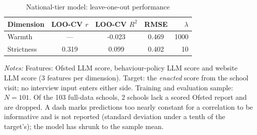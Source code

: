 \begin{table}[htbp]
\centering\caption{National-tier model: leave-one-out performance}
\label{tab:national_model_loo}

\small
\begin{tabular}{lcccr}
\toprule
Dimension & LOO-CV $r$ & LOO-CV $R^2$ & RMSE & $\lambda$ \\
\midrule
Warmth     & --- & -0.023 & 0.469 & 1000 \\
Strictness & 0.319 & 0.099 & 0.402 & 10 \\
\bottomrule
\end{tabular}
\begin{minipage}{\linewidth}
\smallskip
\footnotesize\textit{Notes:} Features: Ofsted LLM score, behaviour-policy LLM score and website LLM score (3 features per dimension). Target: the \emph{enacted} score from the school visit; no interview input enters either side. Training and evaluation sample: $N = 101$. Of the 103 full-data schools, 2 schools lack a scored Ofsted report and are dropped. A dash marks predictions too nearly constant for a correlation to be informative and is not reported (standard deviation under a tenth of the target's); the model has shrunk to the sample mean.
\end{minipage}
\end{table}
